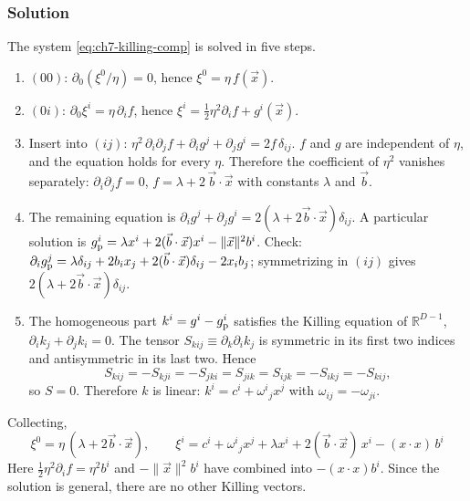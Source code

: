 \subsubsection{Solution}
\tD{} The system \eqref{eq:ch7-killing-comp} is solved in five steps.
\begin{enumerate}[leftmargin=18pt]
\item $(00)$: $\partial_0(\xi^0/\eta)=0$, hence $\xi^0=\eta\,f(\vec x)$.
\item $(0i)$: $\partial_0\xi^i=\eta\,\partial_if$, hence $\xi^i=\tfrac12\eta^2\partial_if+g^i(\vec x)$.
\item Insert into $(ij)$: $\eta^2\,\partial_i\partial_jf+\partial_ig^j+\partial_jg^i=2f\,\delta_{ij}$.
$f$ and $g$ are independent of $\eta$, and the equation holds for every $\eta$.
Therefore the coefficient of $\eta^2$ vanishes separately: $\partial_i\partial_jf=0$, \ie $f=\lambda+2\,\vec b\cdot\vec x$ with constants $\lambda$ and $\vec b$.
\item The remaining equation is $\partial_ig^j+\partial_jg^i=2(\lambda+2\vec b\cdot\vec x)\delta_{ij}$. A particular solution is
$g^i_{\rm p}=\lambda x^i+2(\vec b\cdot\vec x)x^i-\|\vec x\|^2b^i$.
Check: $\partial_ig^j_{\rm p}=\lambda\delta_{ij}+2b_ix_j+2(\vec b\cdot\vec x)\delta_{ij}-2x_ib_j$; symmetrizing in $(ij)$ gives $2(\lambda+2\vec b\cdot\vec x)\delta_{ij}$. \checkmark
\item The homogeneous part $k^i=g^i-g^i_{\rm p}$ satisfies the Killing equation of $\mathbb R^{D-1}$, $\partial_ik_j+\partial_jk_i=0$.
The tensor $S_{kij}\equiv\partial_k\partial_ik_j$ is symmetric in its first two indices and antisymmetric in its last two. Hence
\begin{equation*}
S_{kij}=-S_{kji}=-S_{jki}=S_{jik}=S_{ijk}=-S_{ikj}=-S_{kij},
\end{equation*}
so $S=0$. Therefore $k$ is linear: $k^i=c^i+\omega^i{}_jx^j$ with $\omega_{ij}=-\omega_{ji}$.
\end{enumerate}
Collecting,
\begin{equation}
\boxed{\;\xi^0=\eta\,(\lambda+2\vec b\cdot\vec x),\qquad \xi^i=c^i+\omega^i{}_jx^j+\lambda x^i+2(\vec b\cdot\vec x)\,x^i-(x\cdot x)\,b^i\;}
\label{eq:ch7-killing-sol}
\end{equation}
Here $\tfrac12\eta^2\partial_if=\eta^2b^i$ and $-\|\vec x\|^2b^i$ have combined into $-(x\cdot x)b^i$.
Since the solution is general, there are no other Killing vectors.

